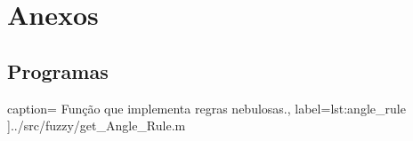\newpage
\section{Anexos}
\subsection{Programas}

 caption={
Função que implementa regras nebulosas.},
label={lst:angle_rule} ]{../src/fuzzy/get_Angle_Rule.m}
 
